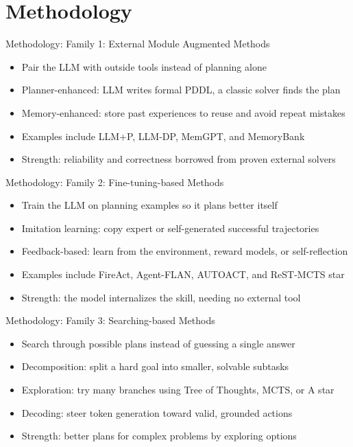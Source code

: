 \documentclass[10pt]{beamer}
\begin{document}
\section{Methodology}
\begin{frame}[allowframebreaks]{Methodology: Family 1: External Module Augmented Methods}
\begin{itemize}
  \item Pair the LLM with outside tools instead of planning alone
  \item Planner-enhanced: LLM writes formal PDDL, a classic solver finds the plan
  \item Memory-enhanced: store past experiences to reuse and avoid repeat mistakes
  \item Examples include LLM+P, LLM-DP, MemGPT, and MemoryBank
  \item Strength: reliability and correctness borrowed from proven external solvers
\end{itemize}
\end{frame}
\begin{frame}[allowframebreaks]{Methodology: Family 2: Fine-tuning-based Methods}
\begin{itemize}
  \item Train the LLM on planning examples so it plans better itself
  \item Imitation learning: copy expert or self-generated successful trajectories
  \item Feedback-based: learn from the environment, reward models, or self-reflection
  \item Examples include FireAct, Agent-FLAN, AUTOACT, and ReST-MCTS star
  \item Strength: the model internalizes the skill, needing no external tool
\end{itemize}
\end{frame}
\begin{frame}[allowframebreaks]{Methodology: Family 3: Searching-based Methods}
\begin{itemize}
  \item Search through possible plans instead of guessing a single answer
  \item Decomposition: split a hard goal into smaller, solvable subtasks
  \item Exploration: try many branches using Tree of Thoughts, MCTS, or A star
  \item Decoding: steer token generation toward valid, grounded actions
  \item Strength: better plans for complex problems by exploring options
\end{itemize}
\end{frame}
\end{document}
